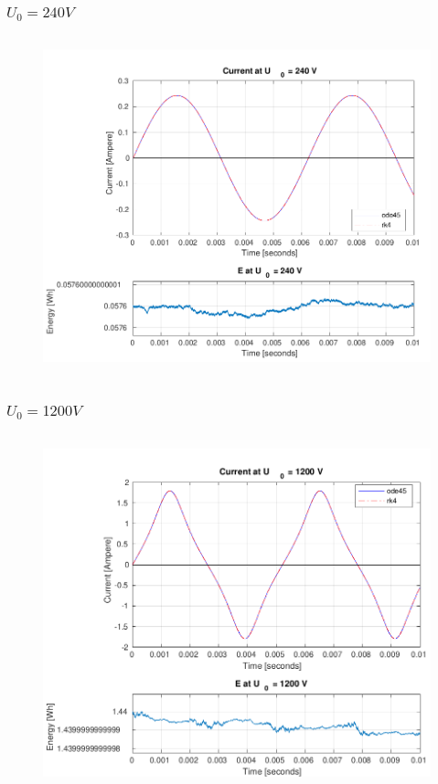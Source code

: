 \documentclass[aspectratio=1610]{beamer}
\begin{document}
\begin{frame}
\frametitle{$U_{0}= 240V$}
\begin{columns}
		\begin{figure}		
			\includegraphics[scale=0.25]{figs/240V + E.png}
      	\end{figure}
      	
\end{columns}    
\end{frame}
\begin{frame}
\frametitle{$U_{0}= 1200V$}
\begin{columns}
		\begin{figure}		
			\includegraphics[scale=0.25]{figs/1200V + E.png}
      	\end{figure}
\end{columns} 
\end{frame}
\end{document}
